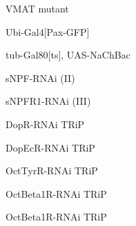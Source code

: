 \documentclass[17pt]{extarticle}
\begin{document}
\footnotesize
\newpage\vspace*{-0.15cm}
\begin{normalsize}
VMAT mutant \\[0.5em]
\end{normalsize}
\footnotesize
\newpage\vspace*{-0.15cm}
\begin{footnotesize}
Ubi-Gal4[Pax-GFP] \\[0.5em]
\end{footnotesize}
\footnotesize
\newpage\vspace*{-0.15cm}
\begin{footnotesize}
tub-Gal80[ts], UAS-NaChBac \\[0.5em]
\end{footnotesize}
\footnotesize
\newpage\vspace*{-0.15cm}
\begin{normalsize}
sNPF-RNAi (II) \\[0.5em]
\end{normalsize}
\footnotesize
\newpage\vspace*{-0.15cm}
\begin{footnotesize}
sNPFR1-RNAi (III) \\[0.5em]
\end{footnotesize}
\footnotesize
\newpage\vspace*{-0.15cm}
\begin{normalsize}
DopR-RNAi TRiP \\[0.5em]
\end{normalsize}
\footnotesize
\newpage\vspace*{-0.15cm}
\begin{footnotesize}
DopEcR-RNAi TRiP \\[0.5em]
\end{footnotesize}
\footnotesize
\newpage\vspace*{-0.15cm}
\begin{footnotesize}
OctTyrR-RNAi TRiP \\[0.5em]
\end{footnotesize}
\footnotesize
\newpage\vspace*{-0.15cm}
\begin{footnotesize}
OctBeta1R-RNAi TRiP \\[0.5em]
\end{footnotesize}
\footnotesize
\newpage\vspace*{-0.15cm}
\begin{footnotesize}
OctBeta1R-RNAi TRiP \\[0.5em]
\end{footnotesize}
\end{document}
